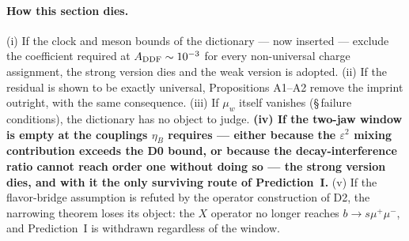 \paragraph{How this section dies.}
(i) If the clock and meson bounds of the dictionary --- now inserted ---
exclude the coefficient required at $A_{\rm DDF}\sim10^{-3}$ for every
non-universal charge assignment, the strong version dies and the weak version
is adopted. (ii) If the residual is shown to be exactly universal,
Propositions A1--A2 remove the imprint outright, with the same consequence.
(iii) If $\mu_w$ itself vanishes (\S\,failure conditions), the dictionary has
no object to judge. \textbf{(iv) If the two-jaw window is empty at the
couplings $\eta_B$ requires --- either because the $\varepsilon^2$ mixing
contribution exceeds the D0 bound, or because the decay-interference ratio
cannot reach order one without doing so --- the strong version dies, and with
it the only surviving route of Prediction~I.} (v) If the flavor-bridge
assumption is refuted by the operator construction of D2, the narrowing
theorem loses its object: the $X$ operator no longer reaches
$b\to s\mu^+\mu^-$, and Prediction~I is withdrawn regardless of the window.

